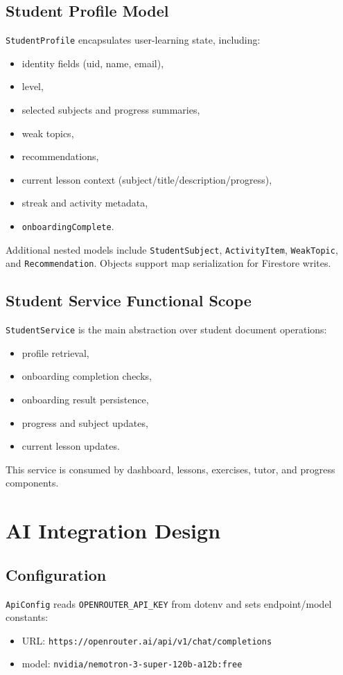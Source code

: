 \documentclass[11pt,a4paper]{article}
\begin{document}
\subsection{Student Profile Model}
\texttt{StudentProfile} encapsulates user-learning state, including:
\begin{itemize}
  \item identity fields (uid, name, email),
  \item level,
  \item selected subjects and progress summaries,
  \item weak topics,
  \item recommendations,
  \item current lesson context (subject/title/description/progress),
  \item streak and activity metadata,
  \item \texttt{onboardingComplete}.
\end{itemize}

Additional nested models include \texttt{StudentSubject}, \texttt{ActivityItem}, \texttt{WeakTopic}, and \texttt{Recommendation}. Objects support map serialization for Firestore writes.

\subsection{Student Service Functional Scope}
\texttt{StudentService} is the main abstraction over student document operations:
\begin{itemize}
  \item profile retrieval,
  \item onboarding completion checks,
  \item onboarding result persistence,
  \item progress and subject updates,
  \item current lesson updates.
\end{itemize}

This service is consumed by dashboard, lessons, exercises, tutor, and progress components.

\section{AI Integration Design}
\subsection{Configuration}
\texttt{ApiConfig} reads \texttt{OPENROUTER\_API\_KEY} from dotenv and sets endpoint/model constants:
\begin{itemize}
  \item URL: \texttt{https://openrouter.ai/api/v1/chat/completions}
  \item model: \texttt{nvidia/nemotron-3-super-120b-a12b:free}
\end{itemize}
\end{document}
